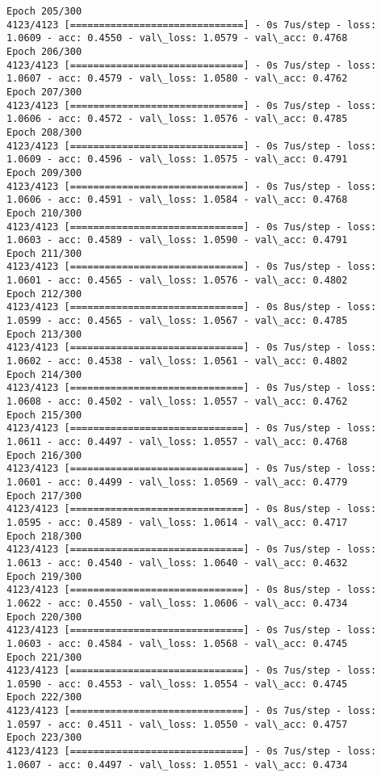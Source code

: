 \documentclass[11pt]{article}
\begin{document}
\begin{Verbatim}[commandchars=\\\{\}]
Epoch 205/300
4123/4123 [==============================] - 0s 7us/step - loss: 1.0609 - acc: 0.4550 - val\_loss: 1.0579 - val\_acc: 0.4768
Epoch 206/300
4123/4123 [==============================] - 0s 7us/step - loss: 1.0607 - acc: 0.4579 - val\_loss: 1.0580 - val\_acc: 0.4762
Epoch 207/300
4123/4123 [==============================] - 0s 7us/step - loss: 1.0606 - acc: 0.4572 - val\_loss: 1.0576 - val\_acc: 0.4785
Epoch 208/300
4123/4123 [==============================] - 0s 7us/step - loss: 1.0609 - acc: 0.4596 - val\_loss: 1.0575 - val\_acc: 0.4791
Epoch 209/300
4123/4123 [==============================] - 0s 7us/step - loss: 1.0606 - acc: 0.4591 - val\_loss: 1.0584 - val\_acc: 0.4768
Epoch 210/300
4123/4123 [==============================] - 0s 7us/step - loss: 1.0603 - acc: 0.4589 - val\_loss: 1.0590 - val\_acc: 0.4791
Epoch 211/300
4123/4123 [==============================] - 0s 7us/step - loss: 1.0601 - acc: 0.4565 - val\_loss: 1.0576 - val\_acc: 0.4802
Epoch 212/300
4123/4123 [==============================] - 0s 8us/step - loss: 1.0599 - acc: 0.4565 - val\_loss: 1.0567 - val\_acc: 0.4785
Epoch 213/300
4123/4123 [==============================] - 0s 7us/step - loss: 1.0602 - acc: 0.4538 - val\_loss: 1.0561 - val\_acc: 0.4802
Epoch 214/300
4123/4123 [==============================] - 0s 7us/step - loss: 1.0608 - acc: 0.4502 - val\_loss: 1.0557 - val\_acc: 0.4762
Epoch 215/300
4123/4123 [==============================] - 0s 7us/step - loss: 1.0611 - acc: 0.4497 - val\_loss: 1.0557 - val\_acc: 0.4768
Epoch 216/300
4123/4123 [==============================] - 0s 7us/step - loss: 1.0601 - acc: 0.4499 - val\_loss: 1.0569 - val\_acc: 0.4779
Epoch 217/300
4123/4123 [==============================] - 0s 8us/step - loss: 1.0595 - acc: 0.4589 - val\_loss: 1.0614 - val\_acc: 0.4717
Epoch 218/300
4123/4123 [==============================] - 0s 7us/step - loss: 1.0613 - acc: 0.4540 - val\_loss: 1.0640 - val\_acc: 0.4632
Epoch 219/300
4123/4123 [==============================] - 0s 8us/step - loss: 1.0622 - acc: 0.4550 - val\_loss: 1.0606 - val\_acc: 0.4734
Epoch 220/300
4123/4123 [==============================] - 0s 7us/step - loss: 1.0603 - acc: 0.4584 - val\_loss: 1.0568 - val\_acc: 0.4745
Epoch 221/300
4123/4123 [==============================] - 0s 7us/step - loss: 1.0590 - acc: 0.4553 - val\_loss: 1.0554 - val\_acc: 0.4745
Epoch 222/300
4123/4123 [==============================] - 0s 7us/step - loss: 1.0597 - acc: 0.4511 - val\_loss: 1.0550 - val\_acc: 0.4757
Epoch 223/300
4123/4123 [==============================] - 0s 7us/step - loss: 1.0607 - acc: 0.4497 - val\_loss: 1.0551 - val\_acc: 0.4734

\end{Verbatim}
\end{document}
